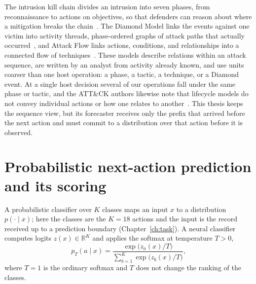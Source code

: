 The intrusion kill chain divides an intrusion into seven phases, from
reconnaissance to actions on objectives, so that defenders can reason
about where a mitigation breaks the chain~\cite{hutchins2011killchain}.
The Diamond Model links the events against one victim into activity
threads, phase-ordered graphs of attack paths that actually
occurred~\cite{caltagirone2013diamond}, and Attack Flow links actions,
conditions, and relationships into a connected flow of
techniques~\cite{mitreattackflow}.
These models describe relations within an attack sequence, are written
by an analyst from activity already known, and use units coarser than
one host operation: a phase, a tactic, a technique, or a Diamond event.
At a single host decision several of our operations fall under the
same phase or tactic, and the ATT\&CK authors likewise note that
lifecycle models do not convey individual actions or how one relates
to another~\cite{strom2018mitre}.
This thesis keeps the sequence view, but its forecaster receives only
the prefix that arrived before the next action and must commit to a
distribution over that action before it is observed.

\section{Probabilistic next-action prediction and its scoring}
\label{sec:bg-scoring}

A probabilistic classifier over $K$ classes maps an input $x$ to a
distribution $p(\cdot\mid x)$; here the classes are the $K=18$ actions
and the input is the record received up to a prediction boundary
(Chapter~\ref{ch:task}). A neural classifier computes logits
$z(x)\in\mathbb{R}^K$ and applies the softmax at temperature $T>0$,
\begin{equation}
  p_T(a\mid x)=\frac{\exp\bigl(z_a(x)/T\bigr)}
                    {\sum_{b=1}^{K}\exp\bigl(z_b(x)/T\bigr)} ,
  \label{eq:bg-softmax}
\end{equation}
where $T=1$ is the ordinary softmax and $T$ does not change the
ranking of the classes.

